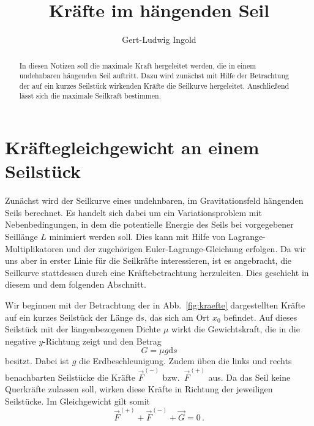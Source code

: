 \documentclass[twocolumn,nobalancelastpage]{revtex4}
\begin{document}
\title{Kräfte im hängenden Seil}
\author{Gert-Ludwig Ingold}
\begin{abstract}
 In diesen Notizen soll die maximale Kraft hergeleitet werden, die in
 einem undehnbaren hängenden Seil auftritt. Dazu wird zunächst
 mit Hilfe der Betrachtung der auf ein kurzes Seilstück
 wirkenden Kräfte die Seilkurve hergeleitet. Anschließend lässt sich die
 maximale Seilkraft bestimmen.
\end{abstract}
\maketitle

\section{Kräftegleichgewicht an einem Seilstück}
\label{sec:kraeftegleichgewicht}
Zunächst wird der Seilkurve eines undehnbaren, im Gravitationsfeld
hängenden Seils berechnet. Es handelt sich dabei um ein
Variationsproblem mit Nebenbedingungen, in dem die potentielle Energie
des Seils bei vorgegebener Seillänge $L$ minimiert werden soll. Dies
kann mit Hilfe von Lagrange-Multiplikatoren und der zugehörigen
Euler-Lagrange-Gleichung erfolgen.  Da wir uns aber in erster Linie
für die Seilkräfte interessieren, ist es angebracht, die Seilkurve
stattdessen durch eine Kräftebetrachtung herzuleiten. Dies geschieht
in diesem und dem folgenden Abschnitt.

Wir beginnen mit der Betrachtung der in Abb.~\ref{fig:kraefte}
dargestellten Kräfte auf ein kurzes Seilstück der Länge $\mathrm{d}s$,
das sich am Ort $x_0$ befindet. Auf dieses Seilstück mit der
längenbezogenen Dichte $\mu$ wirkt die Gewichtskraft, die in die
negative $y$-Richtung zeigt und den Betrag
\begin{equation}
 G = \mu g\mathrm{d}s
\end{equation}
besitzt. Dabei ist $g$ die Erdbeschleunigung. Zudem üben die links und
rechts benachbarten Seilstücke die Kräfte $\vec F^{(-)}$ bzw.\ $\vec
F^{(+)}$ aus. Da das Seil keine Querkräfte zulassen soll, wirken diese
Kräfte in Richtung der jeweiligen Seilstücke. Im Gleichgewicht gilt
somit
\begin{equation}
 \vec F^{(+)}+\vec F^{(-)}+\vec G = 0\,.
 \label{eq:kraftgleichgewicht}
\end{equation}
\end{document}
